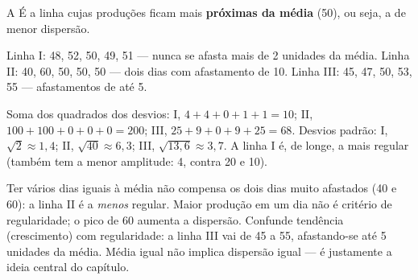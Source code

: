 \begin{resolucao}{A}
 É a linha cujas produções ficam mais \textbf{próximas da
média} (50), ou seja, a de menor dispersão.

 Linha I: 48, 52, 50, 49, 51 — nunca se afasta mais de 2 unidades da
média. Linha II: 40, 60, 50, 50, 50 — dois dias com afastamento de 10. Linha III: 45, 47, 50, 53,
55 — afastamentos de até 5.

 Soma dos quadrados dos desvios: I, $4 + 4 + 0 + 1 + 1 = 10$;
II, $100 + 100 + 0 + 0 + 0 = 200$; III, $25 + 9 + 0 + 9 + 25 = 68$. Desvios padrão: I,
$\sqrt{2} \approx 1{,}4$; II, $\sqrt{40} \approx 6{,}3$; III, $\sqrt{13{,}6} \approx 3{,}7$. A linha I é,
de longe, a mais regular (também tem a menor amplitude: 4, contra 20 e 10).

\begin{distratores}
 Ter vários dias iguais à média não compensa os dois dias muito afastados (40 e 60): a linha II
é a \emph{menos} regular.
 Maior produção em um dia não é critério de regularidade; o pico de 60 aumenta a dispersão.
 Confunde tendência (crescimento) com regularidade: a linha III vai de 45 a 55, afastando-se
até 5 unidades da média.
 Média igual não implica dispersão igual — é justamente a ideia central do capítulo.
\end{distratores}
\end{resolucao}

